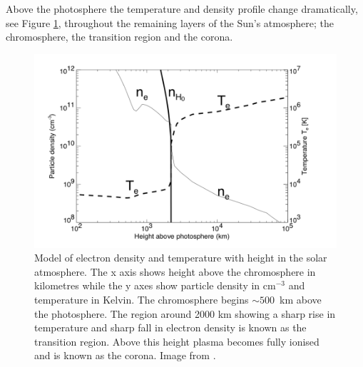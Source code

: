 Above the photosphere the temperature and density profile change dramatically, see Figure \ref{fig:corona_temp}, throughout the remaining layers of the Sun's atmosphere; the chromosphere, the transition region and the corona. 
\begin{figure}
    \centering
    \includegraphics[width=\columnwidth]{Images/Corona_temp.png}
    \caption[Model of electron density and temperature with height in the solar atmosphere.]{Model of electron density and temperature with height in the solar atmosphere. The x axis shows height above the chromosphere in kilometres while the y axes show particle density in cm$^{-3}$ and temperature in Kelvin. The chromosphere begins $\sim 500$~km above the photosphere. The region around 2000 km showing a sharp rise in temperature and sharp fall in electron density is known as the transition region. Above this height plasma becomes fully ionised and is known as the corona. Image from \cite{Aschwanden2004}.}
    \label{fig:corona_temp}
\end{figure}


